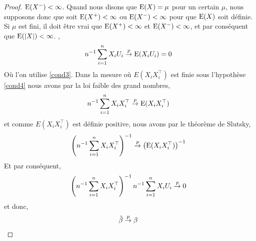 \begin{proof}
{$\operatorname{E}(X^{-}) <\infty$. Quand nous disons que $\operatorname{E}(X) = \mu$ pour un certain $\mu$, nous supposons donc que  soit
$\operatorname{E}(X^{+}) <\infty$ ou $\operatorname{E}(X^{-}) <\infty$ pour que $\operatorname{E}(X)$ soit définie.
Si $\mu$ est fini, il doit être vrai que $\operatorname{E}(X^{+}) < \infty$ et $\operatorname{E}(X^{-}) <\infty$, et
par conséquent que $\operatorname{E}(\left\vert {X} \right\vert) < \infty$.
},
\begin{align*}
n^{-1} \sum_{i=1}^n X_iU_i \overset{p}{\rightarrow} \operatorname{E}(X_iU_i) = 0
\end{align*}
Où l'on utilise \ref{cond3}. Dans la mesure où $E(X_iX_i^\top)$ est finie sous l'hypothèse \ref{cond4} nous avons par la loi faible des grand nombres,
\begin{align*}
n^{-1} \sum_{i=1}^n X_iX_i^\top \overset{p}{\rightarrow} \operatorname{E}(X_iX_i^\top)
\end{align*}
et comme  $E(X_iX_i^\top)$ est définie positive, nous avons  par le théorème de Slutsky,
\begin{align}
\left(n^{-1} \sum_{i=1}^n X_iX_i^\top\right)^{-1} \overset{p}{\rightarrow} \left(\operatorname{E}(X_iX_i^\top)\right)^{-1}
\label{eq2}
\end{align}
Et par conséquent,
\begin{align*}
\left(n^{-1}\sum_{i=1}^n X_iX_i^\top\right)^{-1}n^{-1}\sum_{i=1}^n X_iU_i \overset{p}{\rightarrow} 0
\end{align*}
et donc,
\begin{align*}
\hat{\beta}\overset{p}{\rightarrow} \beta
\end{align*}
\end{proof}

